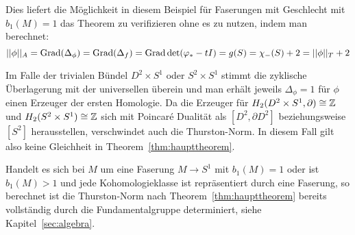 \begin{bsp}
        Dies liefert die Möglichkeit in diesem Beispiel für Faserungen mit Geschlecht mit $b_1(M)=1$ das Theorem zu verifizieren ohne es zu nutzen, indem man berechnet: 
        \[
            ||\phi||_A=\operatorname{Grad}(\Delta_\phi)=\operatorname{Grad} (\Delta_f) = \operatorname{Grad} \det (\varphi_*-tI) = g(S) = \chi_-(S) +2 = ||\phi||_T+2
        \]

        Im Falle der trivialen Bündel $D^2\times S^1$ oder $S^2\times S^1$ stimmt die zyklische Überlagerung mit der universellen überein und man erhält jeweils $\Delta_\phi =1$ für $\phi$ einen Erzeuger der ersten Homologie. Da die Erzeuger für $H_2(D^2 \times S^1, \partial)\cong \mathbb{Z}$ und $H_2(S^2\times S^1) \cong \mathbb{Z}$ sich mit Poincaré Dualität als $[D^2,\partial D^2]$ beziehungsweise $[S^2]$ herausstellen, verschwindet auch die Thurston-Norm. In diesem Fall gilt also keine Gleichheit in Theorem~\ref{thm:haupttheorem}. 

    \end{bsp}

    \begin{bsp}
        Handelt es sich bei $M$ um eine Faserung $M\to S^1$ mit $b_1(M)=1$ oder ist $b_1(M)>1$ und jede Kohomologieklasse ist repräsentiert durch eine Faserung, so berechnet ist die Thurston-Norm nach Theorem~\ref{thm:haupttheorem} bereits vollständig durch die Fundamentalgruppe determiniert, siehe Kapitel~\ref{sec:algebra}.
    \end{bsp}




